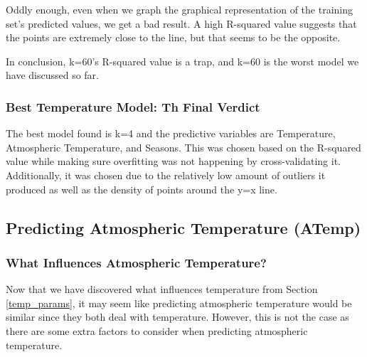 \documentclass[12pt]{article}
\begin{document}
Oddly enough, even when we graph the graphical representation of the training set's predicted values, we get a bad result. A high R-squared value suggests that the points are extremely close to the line, but that seems to be the opposite.

In conclusion, k=60's R-squared value is a trap, and k=60 is the worst model we have discussed so far.

\subsubsection{Best Temperature Model: Th Final Verdict}
The best model found is k=4 and the predictive variables are Temperature, Atmospheric Temperature, and Seasons. This was chosen based on the R-squared value while making sure overfitting was not happening by cross-validating it. Additionally, it was chosen due to the relatively low amount of outliers it produced as well as the density of points around the y=x line.

\newpage
\subsection{Predicting Atmospheric Temperature (ATemp)} \label{predictingatemp}
\subsubsection{What Influences Atmospheric Temperature?} \label{atemp_params}
Now that we have discovered what influences temperature from Section \ref{temp_params}, it may seem like predicting atmospheric temperature would be similar since they both deal with temperature. However, this is not the case as there are some extra factors to consider when predicting atmospheric temperature.
\end{document}
